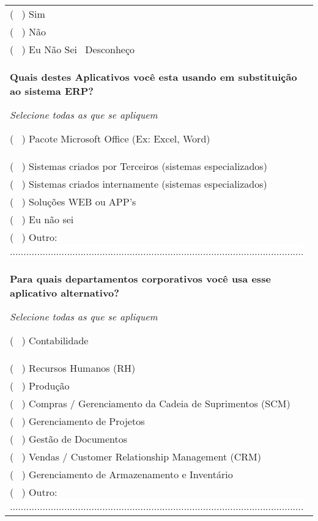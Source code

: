 \begin{longtable}{|p{15.7cm}|}
	( \ ) Sim\\
	( \ ) Não\\
	( \ ) Eu Não Sei \ Desconheço\\
	\begin{Spacing}{0.8} \end{Spacing}
	\begin{Spacing}{0.8} 
		\textbf{Quais destes Aplicativos você esta usando em substituição ao sistema ERP?} \end{Spacing} 
	\begin{Spacing}{2.0} 
		\tiny \textit{Selecione todas as que se apliquem} \end{Spacing} 
	( \ ) Pacote Microsoft Office (Ex: Excel, Word) \\
	( \ ) Sistemas criados por Terceiros (sistemas especializados) \\
	( \ ) Sistemas criados internamente (sistemas especializados) \\
	( \ ) Soluções WEB ou APP's \\
	( \ ) Eu não sei \\
	( \ ) Outro: \colorbox{white}{ ............................................................................................................ } \\	
	\begin{Spacing}{0.8} \end{Spacing}
	\begin{Spacing}{0.8} 
		\textbf{Para quais departamentos corporativos você usa esse aplicativo alternativo?} \end{Spacing} 
	\begin{Spacing}{2.0} 
		\tiny \textit{Selecione todas as que se apliquem} \end{Spacing} 
	( \ ) Contabilidade \\
	( \ ) Recursos Humanos (RH) \\
	( \ ) Produção  \\
	( \ ) Compras / Gerenciamento da Cadeia de Suprimentos (SCM)  \\
	( \ ) Gerenciamento de Projetos  \\
	( \ ) Gestão de Documentos  \\
	( \ ) Vendas / Customer Relationship Management (CRM) \\
	( \ ) Gerenciamento de Armazenamento e Inventário \\
	( \ ) Outro: \colorbox{white}{ ............................................................................................................ } \\

\end{longtable}
